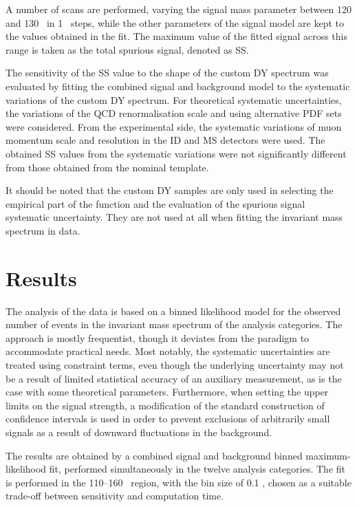 A number of scans are performed, varying the signal mass parameter
between 120 and 130 \GeV~in 1 \GeV~steps, while the other parameters
of the signal model are kept to the values obtained in the fit.
The maximum value of the fitted signal across this range is taken
as the total spurious signal, denoted as SS.

The sensitivity of the SS value to the shape of the custom DY
spectrum was evaluated by fitting the combined signal and
background model to the systematic variations of the custom DY
spectrum. For theoretical systematic uncertainties, the variations
of the QCD renormalisation scale and using alternative PDF sets
were considered. From the experimental side, the systematic
variations of muon momentum scale and resolution in the ID and
MS detectors were used. The obtained SS values from the
systematic variations were not significantly different from
those obtained from the nominal template.

It should be noted that the custom DY samples are only used in
selecting the empirical part of the function and the evaluation
of the spurious signal systematic uncertainty. They are not used
at all when fitting the invariant mass spectrum in data.

\section{Results}

The analysis of the data is based on a binned likelihood model
for the observed number of events in the invariant mass spectrum
of the analysis categories. The approach is mostly frequentist,
though it deviates from the paradigm to accommodate practical needs.
Most notably, the systematic uncertainties are treated using
constraint terms, even though the underlying uncertainty may not
be a result of limited statistical accuracy of an auxiliary
measurement, as is the case with some theoretical parameters.
Furthermore, when setting the upper limits on the signal
strength, a modification of the standard construction of
confidence intervals is used in order to prevent exclusions of
arbitrarily small signals as a result of downward fluctuations
in the background.

The results are obtained by a combined signal and background
binned maximum-likelihood fit, performed simultaneously in the
twelve analysis categories. The fit is performed in the 110--160
\GeV~region, with the bin size of 0.1 \GeV, chosen as a suitable trade-off
between sensitivity and computation time.

